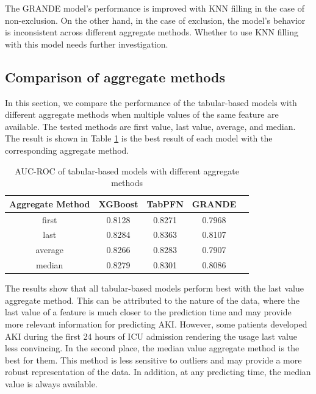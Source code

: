 \documentclass[sn-mathphys-num]{sn-jnl}%
\theoremstyle{thmstyleone}%
\theoremstyle{thmstyletwo}%
\theoremstyle{thmstylethree}%
\begin{document}
The GRANDE model's performance is improved with KNN filling in the case of non-exclusion.
On the other hand, in the case of exclusion, the model's behavior is inconsistent across different aggregate methods.
Whether to use KNN filling with this model needs further investigation.

\subsection{Comparison of aggregate methods}
\label{sec:aggregate_methods}

In this section, we compare the performance of the tabular-based models with different aggregate methods when multiple values of the same feature are available.
The tested methods are first value, last value, average, and median.
The result is shown in Table \ref{tab:aggregate_methods} is the best result of each model with the corresponding aggregate method.

\begin{table}[h!]
    \centering
    \caption{AUC-ROC of tabular-based models with different aggregate methods}
    \label{tab:aggregate_methods}
    \begin{tabular}{|c|c|c|c|c|}
        \hline
        \textbf{Aggregate Method} & \textbf{XGBoost} &       \textbf{TabPFN} & \textbf{GRANDE} \\ \hline
        first & 0.8128 & 0.8271 & 0.7968 \\ \hline
        last & 0.8284 & 0.8363 & 0.8107 \\ \hline
        average & 0.8266 & 0.8283 & 0.7907 \\ \hline
        median & 0.8279 & 0.8301 & 0.8086 \\ \hline
    \end{tabular}
\end{table}

The results show that all tabular-based models perform best with the last value aggregate method.
This can be attributed to the nature of the data, where the last value of a feature is much closer to the prediction time and may provide more relevant information for predicting AKI.
However, some patients developed AKI during the first 24 hours of ICU admission rendering the usage last value less convincing.
In the second place, the median value aggregate method is the best for them.
This method is less sensitive to outliers and may provide a more robust representation of the data.
In addition, at any predicting time, the median value is always available.
\end{document}
